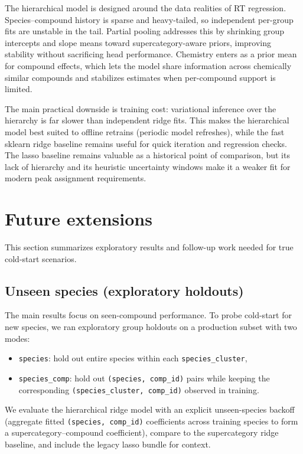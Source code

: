 \documentclass[11pt]{article}
\begin{document}
The hierarchical model is designed around the data realities of RT regression. Species--compound history is sparse and
heavy-tailed, so independent per-group fits are unstable in the tail. Partial pooling addresses this by shrinking group
intercepts and slope means toward supercategory-aware priors, improving stability without sacrificing head performance.
Chemistry enters as a prior mean for compound effects, which lets the model share information across chemically similar
compounds and stabilizes estimates when per-compound support is limited.

The main practical downside is training cost: variational inference over the hierarchy is far slower than independent
ridge fits. This makes the hierarchical model best suited to offline retrains (periodic model refreshes), while the fast
sklearn ridge baseline remains useful for quick iteration and regression checks. The lasso baseline remains valuable as a
historical point of comparison, but its lack of hierarchy and its heuristic uncertainty windows make it a weaker fit for
modern peak assignment requirements.

\section{Future extensions}

This section summarizes exploratory results and follow-up work needed for true cold-start scenarios.

\subsection{Unseen species (exploratory holdouts)}

The main results focus on seen-compound performance. To probe cold-start for new species, we ran exploratory group
holdouts on a production subset with two modes:
\begin{itemize}
  \item \texttt{species}: hold out entire species within each \texttt{species\_cluster},
  \item \texttt{species\_comp}: hold out \texttt{(species, comp\_id)} pairs while keeping the corresponding
  \texttt{(species\_cluster, comp\_id)} observed in training.
\end{itemize}

We evaluate the hierarchical ridge model with an explicit unseen-species backoff (aggregate fitted
\texttt{(species, comp\_id)} coefficients across training species to form a supercategory--compound coefficient), compare
to the supercategory ridge baseline, and include the legacy lasso bundle for context.
\end{document}
